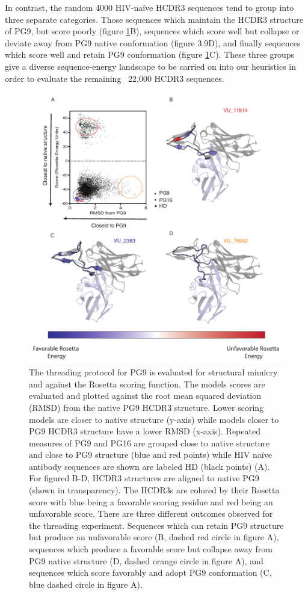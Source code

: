 In contrast, the random 4000 HIV-naïve HCDR3 sequences tend to group into three separate categories. Those sequences which maintain the HCDR3 structure of PG9, but score poorly (figure \ref{fig:figure3_9}B), sequences which score well but collapse or deviate away from PG9 native conformation (figure 3.9D), and finally sequences which score well and retain PG9 conformation (figure \ref{fig:figure3_9}C). These three groups give a diverse sequence-energy landscape to be carried on into our heuristics in order to evaluate the remaining ~22,000 HCDR3 sequences.

\begin{figure}
   \centering
   \includegraphics[width=.9\linewidth]{images/chapter3/figure3_9.pdf} %
   \caption[Threading PG9 Produces Three Structural Outcomes ]{The threading protocol for PG9 is evaluated for structural mimicry and against the Rosetta scoring function. The models scores are evaluated and plotted against the root mean squared deviation (RMSD) from the native PG9 HCDR3 structure. Lower scoring models are closer to native structure (y-axis) while models closer to PG9 HCDR3 structure have a lower RMSD (x-axis). Repeated measures of PG9 and PG16 are grouped close to native structure and close to PG9 structure (blue and red points) while HIV naïve antibody sequences are shown are labeled HD (black points) (A). For figured B-D, HCDR3 structures are aligned to native PG9 (shown in transparency). The HCDR3s are colored by their Rosetta score with blue being a favorable scoring residue and red being an unfavorable score. There are three different outcomes observed for the threading experiment. Sequences which can retain PG9 structure but produce an unfavorable score (B, dashed red circle in figure A), sequences which produce a favorable score but collapse away from PG9 native structure (D, dashed orange circle in figure A), and sequences which score favorably and adopt PG9 conformation (C, blue dashed circle in figure A).}
   \label{fig:figure3_9}
\end{figure}


